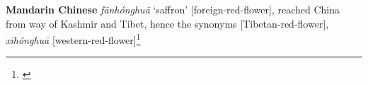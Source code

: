 \begin{etymology}\label{ety:fanhonghua}
\textbf{Mandarin Chinese}  \textit{fānhónghuā} `saffron' [foreign-red-flower], reached China from way of Kashmir and Tibet, hence the synonyms  [Tibetan-red-flower],  \textit{xīhónghuā} [western-red-flower]\footnote{\textcite{kleeman_oxford_2010}}
\end{etymology}